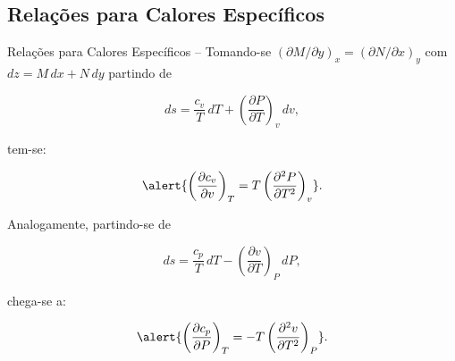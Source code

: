\subsection{Relações para Calores Específicos}

    \begin{frame}[allowframebreaks]{Relações para Calores Específicos --}\vspace*{-0em}
        Tomando-se \alert{$(\partial M/\partial y)_x = (\partial N/\partial x)_y$}
        com \alert{$dz = M\,dx + N\,dy$} partindo de

        \begin{equation*}
            ds = 
                \frac{c_v}{T}\,dT +
                \left(
                    \frac{\partial P}{\partial T}
                \right)_v\,dv,
        \end{equation*}

        \noindent tem-se:

        \begin{equation*}
            \alert{
                \left(
                    \frac{\partial c_v}{\partial v}
                \right)_T =
                T\left(
                    \frac{\partial^2 P}{\partial T^2}
                \right)_v
            }.
        \end{equation*}

        \pagebreak
        Analogamente, partindo-se de

        \begin{equation*}
            ds = 
                \frac{c_p}{T}\,dT -
                \left(
                    \frac{\partial v}{\partial T}
                \right)_P\,dP,
        \end{equation*}

        \noindent chega-se a:

        \begin{equation*}
            \alert{
                \left(
                    \frac{\partial c_p}{\partial P}
                \right)_T =
                -T\left(
                    \frac{\partial^2 v}{\partial T^2}
                \right)_P
            }.
        \end{equation*}

    \end{frame}

